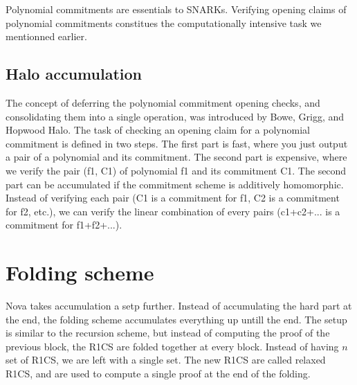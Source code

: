 Polynomial commitments are essentials to SNARKs. Verifying opening claims of polynomial commitments constitues the computationally intensive task we mentionned earlier. \cite{VR23}


\subsection{Halo accumulation}

The concept of deferring the polynomial commitment opening checks, and consolidating them into a single operation, was introduced by Bowe, Grigg, and Hopwood Halo.\cite{BGH23}
The task of checking an opening claim for a polynomial commitment is defined in two steps.
The first part is fast, where you just output a pair of a polynomial and its commitment. The second part is expensive, where we verify the pair (f1, C1) of polynomial f1 and its commitment C1.
The second part can be accumulated if the commitment scheme is additively homomorphic. 
Instead of verifying each pair (C1 is a commitment for f1, C2 is a commitment for f2, etc.), we can verify the linear combination of every pairs (c1+c2+... is a commitment for f1+f2+...). \cite{VR23}


\section{Folding scheme} 
Nova takes accumulation a setp further. Instead of accumulating the hard part at the end, the folding scheme accumulates everything up untill the end.
The setup is similar to the recursion scheme, but instead of computing the proof of the previous block, the R1CS are folded together at every block.
Instead of having $n$ set of R1CS, we are left with a single set. The new R1CS are called relaxed R1CS, and are used to compute a single proof at the end of the folding.
\cite{Nova23}  \cite{ASI23} 


